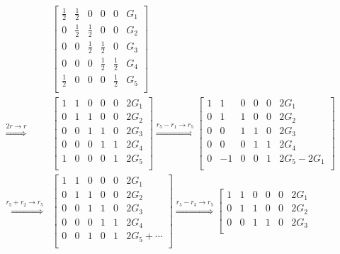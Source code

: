 \documentclass[]{article}
\begin{document}
\begin{align}
	&\left[
	\begin{array}{ccccc|c}
	\frac{1}{2} & \frac{1}{2} & 0 & 0 & 0 & G_1 \\
	0 & \frac{1}{2} & \frac{1}{2} & 0 & 0 & G_2 \\
	0 & 0 & \frac{1}{2} & \frac{1}{2} & 0 & G_3 \\
	0 & 0 & 0 & \frac{1}{2} & \frac{1}{2} & G_4 \\
	\frac{1}{2} & 0 & 0 & 0 & \frac{1}{2} & G_5 \\
	\end{array}
	\right] \\
	\overset{2r \to r}{\Longrightarrow} &\left[
	\begin{array}{ccccc|c}
	1 & 1 & 0 & 0 & 0 & 2G_1 \\
	0 & 1 & 1 & 0 & 0 & 2G_2 \\
	0 & 0 & 1 & 1 & 0 & 2G_3 \\
	0 & 0 & 0 & 1 & 1 & 2G_4 \\
	1 & 0 & 0 & 0 & 1 & 2G_5 \\
	\end{array}
	\right] \overset{r_5 - r_1 \to r_5}{\Longrightarrow}
	\left[
	\begin{array}{ccccc|c}
	1 & 1 & 0 & 0 & 0 & 2G_1 \\
	0 & 1 & 1 & 0 & 0 & 2G_2 \\
	0 & 0 & 1 & 1 & 0 & 2G_3 \\
	0 & 0 & 0 & 1 & 1 & 2G_4 \\
	0 & -1 & 0 & 0 & 1 & 2G_5 - 2G_1 \\
	\end{array}
	\right] \\
	\overset{r_5 + r_2 \to r_5}{\Longrightarrow} &\left[
	\begin{array}{ccccc|c}
	1 & 1 & 0 & 0 & 0 & 2G_1 \\
	0 & 1 & 1 & 0 & 0 & 2G_2 \\
	0 & 0 & 1 & 1 & 0 & 2G_3 \\
	0 & 0 & 0 & 1 & 1 & 2G_4 \\
	0 & 0 & 1 & 0 & 1 & 2G_5 + \cdots \\
	\end{array}
	\right] \overset{r_5 - r_3 \to r_5}{\Longrightarrow}
	\left[
	\begin{array}{ccccc|c}
	1 & 1 & 0 & 0 & 0 & 2G_1 \\
	0 & 1 & 1 & 0 & 0 & 2G_2 \\
	0 & 0 & 1 & 1 & 0 & 2G_3 \\

\end{array}
\end{align}
\end{document}
